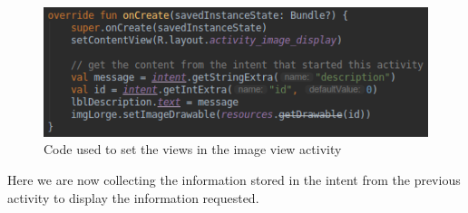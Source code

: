 \documentclass{scrartcl}
\begin{document}
\pagebreak

\begin{figure}[h]
    \centering
    \includegraphics[scale=0.6]{images/screen4.png}
    \caption{Code used to set the views in the image view activity}
\end{figure}

Here we are now collecting the information stored in the intent from the previous activity to
display the information requested.

\pagebreak
\end{document}

